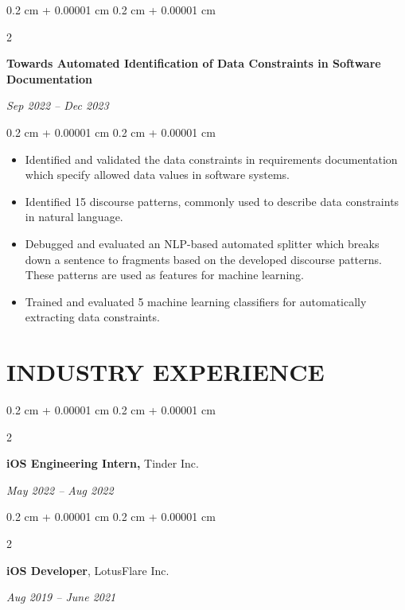 \documentclass[10pt, letterpaper]{article}
\newenvironment{highlights}{
    \begin{itemize}[
        topsep=0.10 cm,
        parsep=0.10 cm,
        partopsep=0pt,
        itemsep=0pt,
        leftmargin=0.4 cm + 10pt
    ]
}{
    \end{itemize}
} %
\newenvironment{onecolentry}{
    \begin{adjustwidth}{
        0.2 cm + 0.00001 cm
    }{
        0.2 cm + 0.00001 cm
    }
}{
    \end{adjustwidth}
} %
\newenvironment{twocolentry}[2][]{
    \onecolentry
    \def\secondColumn{#2}
    \setcolumnwidth{\fill, 4.5 cm}
    \begin{paracol}{2}
}{
    \switchcolumn \raggedleft \secondColumn
    \end{paracol}
    \endonecolentry
} %
\begin{document}
        \vspace{0.2 cm}

        \begin{twocolentry}{
        \textit{Sep 2022 – Dec 2023}}
            \textbf{Towards Automated Identification of Data Constraints in Software Documentation}
        \end{twocolentry}

        \vspace{0.10 cm}
        \begin{onecolentry}
            \begin{highlights}
            \item Identified and validated the data constraints in requirements documentation which specify allowed data values in software systems.
            \item Identified 15 discourse patterns, commonly used to describe data constraints in natural language. 
            \item Debugged and evaluated an NLP-based automated splitter which breaks down a sentence to fragments based on the developed discourse patterns. These patterns are used as features for machine learning.
            \item Trained and evaluated 5 machine learning classifiers for automatically extracting data constraints.
            \end{highlights}
        \end{onecolentry}


    \section{INDUSTRY EXPERIENCE}

        \begin{twocolentry}{
        \textit{May 2022 – Aug 2022}
        }
        
        \textbf{iOS Engineering Intern, }Tinder Inc.  
        
        \end{twocolentry}

        \vspace{0.2 cm}

        \begin{twocolentry}{
        \textit{Aug 2019 – June 2021}
        }
        
        \textbf{iOS Developer}, LotusFlare Inc.   
        
        \end{twocolentry}
\end{document}
